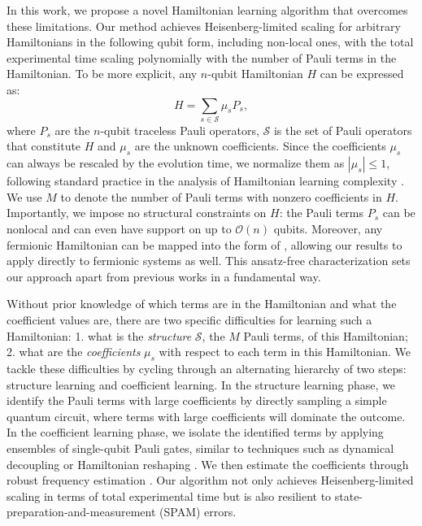\documentclass[twocolumn,superscriptaddress,aps,showpacs,amsmath,amstex,amssymb,citeautoscript,floatfix,pra,preprintnumbers]{revtex4-2}
\newcounter{alg}
\theoremstyle{plain}
\theoremstyle{plain}
\theoremstyle{plain}
\theoremstyle{plain}
\theoremstyle{plain}
\theoremstyle{plain}
\begin{document}
In this work, we propose a novel Hamiltonian learning algorithm that overcomes these limitations. 
Our method achieves Heisenberg-limited scaling for arbitrary Hamiltonians in the following qubit form, including non-local ones, with the total experimental time scaling polynomially with the number of Pauli terms in the Hamiltonian. 
To be more explicit, any $n$-qubit Hamiltonian $H$ can be expressed as:
\begin{equation}
\label{eq:unknown_Hamiltonian}
    H = \sum_{s\in \mathcal{S}} \mu_s P_s,
\end{equation}
where $P_s$ are the $n$-qubit traceless Pauli operators, $\mathcal{S}$ is the set of Pauli operators that constitute $H$ and $\mu_s$ are the unknown coefficients. Since the coefficients $\mu_s$ can always be rescaled by the evolution time, we normalize them as $|\mu_s| \leq 1$, following standard practice in the analysis of Hamiltonian learning complexity \cite{HuangTongFangSu2023learning,HighTempGibbs}. We use $M$ to denote the number of Pauli terms with nonzero coefficients in $H$. Importantly, we impose no structural constraints on $H$: the Pauli terms $P_s$ can be nonlocal and can even have support on up to $\mathcal{O}(n)$ qubits. Moreover, any fermionic Hamiltonian can be mapped into the form of , allowing our results to apply directly to fermionic systems as well.  This ansatz-free characterization sets our approach apart from previous works in a fundamental way.







Without prior knowledge of which terms are in the Hamiltonian and what the coefficient values are, there are two specific difficulties for learning such a Hamiltonian: 1. what is the \emph{structure} $\mathcal{S}$, the $M$ Pauli terms, of this Hamiltonian; 2. what are the \emph{coefficients}  $\mu_s$ with respect to each term in this Hamiltonian. We tackle these difficulties by 
cycling through an alternating hierarchy of two steps: structure learning and coefficient learning.
In the structure learning phase, we identify the Pauli terms with large coefficients by directly sampling a simple quantum circuit, where terms with large coefficients will dominate the outcome.
In the coefficient learning phase, we isolate the identified terms by applying ensembles of single-qubit Pauli gates, similar to techniques such as dynamical decoupling \cite{ReviewOfDD,PhysRevX.10.031002,PhysRevLett.119.183603,SDD} or Hamiltonian reshaping \cite{HuangTongFangSu2023learning,ma2024learningkbodyhamiltonianscompressed}. We then estimate the coefficients through robust frequency estimation \cite{KimmelLowYoder2015robust}. Our algorithm not only achieves Heisenberg-limited scaling in terms of total experimental time but is also resilient to state-preparation-and-measurement (SPAM) errors.
\end{document}
